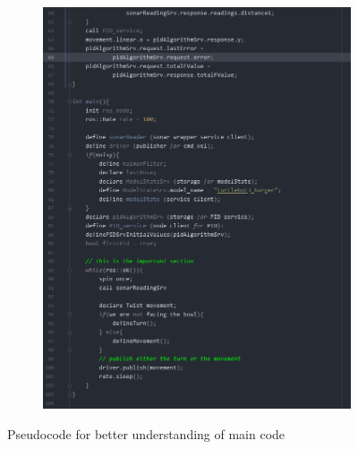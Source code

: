 \documentclass{article}
\begin{document}
\begin{figure}[ht]
\begin{subfigure}{.5\textwidth}
    \end{subfigure}
    \begin{subfigure}{.5\textwidth}
        \centering
        \includegraphics[scale=0.30]{img/pseudocode_2.png}
    \end{subfigure}
    \caption{Pseudocode for better understanding of main code}
    \label{controllerPseudo}
\end{figure}
\end{document}
